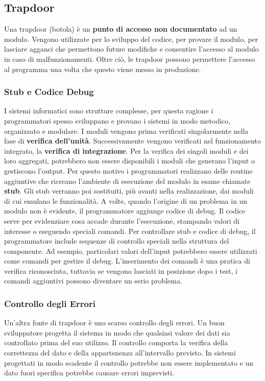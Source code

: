 \subsection{Trapdoor}
Una trapdoor (botola) è un \textbf{punto di accesso non documentato} ad un modulo. Vengono utilizzate per lo sviluppo del codice, per provare il modulo, per lasciare agganci che permettono future modifiche e consentire l'accesso al modulo in caso di malfunzionamenti. Oltre ciò, le trapdoor possono permettere l'accesso al programma una volta che questo viene messo in produzione.
\subsubsection{Stub e Codice Debug}
I sistemi informatici sono strutture complesse, per questa ragione i programmatori spesso sviluppano e provano i sistemi in modo metodico, organizzato e modulare. I moduli vengono prima verificati singolarmente nella fase di \textbf{verifica dell'unità}. Successivamente vengono verificati nel funzionamento integrato, la \textbf{verifica di integrazione}.
Per la verifica dei singoli moduli e dei loro aggregati, potrebbero non essere disponibili i moduli che generano l'input o gestiscono l'output. Per questo motivo i programmatori realizzano delle routine aggiuntive che ricreano l'ambiente di esecuzione del modulo in esame chiamate \textbf{stub}. Gli stub verranno poi sostituiti, più avanti nella realizzazione, dai moduli di cui emulano le funzionalità. A volte, quando l'origine di un problema in un modulo non è evidente, il programmatore aggiunge codice di debug. Il codice serve per evidenziare cosa accade durante l'esecuzione, stampando valori di interesse o eseguendo speciali comandi.
\newline
Per controllare stub e codice di debug, il programmatore include sequenze di controllo speciali nella struttura del componente. Ad esempio, particolari valori dell’input potrebbero essere utilizzati come comandi per gestire il debug. L'inserimento dei comandi è una pratica di verifica riconosciuta, tuttavia se vengono lasciati in posizione dopo i test, i comandi aggiuntivi possono diventare un serio problema.
\subsubsection{Controllo degli Errori}
Un'altra fonte di trapdoor è uno scarso controllo degli errori. Un buon sviluppatore progetta il sistema in modo che qualsiasi valore dei dati sia controllato prima del suo utilizzo. Il controllo comporta la verifica della correttezza del dato e della appartenenza all'intervallo previsto.
In sistemi progettati in modo scadente il controllo potrebbe non essere implementato e un dato fuori specifica potrebbe causare errori imprevisti.
